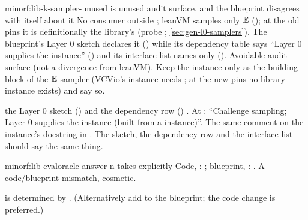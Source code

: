 \begin{finding}{minor}{f:lib-k-sampler-unused}{\texorpdfstring{}{SampleableType K} is unused audit surface, and the blueprint disagrees with itself about it}
 No consumer outside \allowbreak{}; leanVM samples only $\mathbb{E}$
(\allowbreak{}\allowbreak{}\allowbreak{}); at the old pins it is definitionally the library's
 (probe ; \cref{sec:gen-l0-samplers}). The
blueprint's Layer 0 sketch declares it () while its dependency
table says \enquote{Layer 0 supplies the  instance} () and its interface list
names only  ().
 Avoidable audit surface (not a divergence from leanVM).
 Keep the instance only as the building block of the $\mathbb{E}$ sampler (VCVio's
 instance needs ; at the new pins no library instance exists)
and say so.
\begin{change}{the Layer 0 sketch () and the dependency row ()}
\asis {}
\asproposed {}.
At : \enquote{Challenge sampling; Layer 0 supplies the  instance (built from a
 instance)}. The same comment on the instance's docstring in
\allowbreak{}.
\reason The sketch, the dependency row and the interface list should say the same thing.
\end{change}
\end{finding}

\begin{finding}{minor}{f:lib-evaloracle-answer-n}{\texorpdfstring{}{evalOracle\_answer} takes \texorpdfstring{}{n} explicitly}
 Code, \allowbreak{}:
\allowbreak{}; blueprint, :
\allowbreak{}.
 A code/blueprint mismatch, cosmetic.
\begin{change}{\allowbreak{}\allowbreak{}}
\asis {}\allowbreak{}
\asproposed {}
\reason {} is determined by . (Alternatively add  to the blueprint; the
code change is preferred.)
\end{change}
\end{finding}

